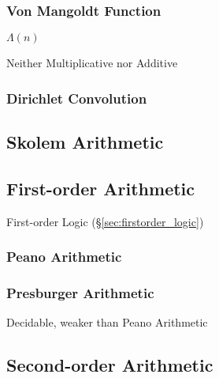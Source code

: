 \subsubsection{Von Mangoldt Function}\label{sec:vonmangoldt_function}

$\Lambda(n)$

Neither Multiplicative nor Additive



\subsubsection{Dirichlet Convolution}\label{sec:dirichlet_convolution}



\subsection{Skolem Arithmetic}\label{sec:skolem_arithmetic}
\cite{skolem23}

\subsection{First-order Arithmetic}\label{sec:firstorder_arithmetic}

First-order Logic (\S\ref{sec:firstorder_logic})



\subsubsection{Peano Arithmetic}\label{sec:peano_arithmetic}

\subsubsection{Presburger Arithmetic}\label{sec:presburger_arithmetic}

Decidable, weaker than Peano Arithmetic



\subsection{Second-order Arithmetic}\label{sec:second_order_arithmetic}

